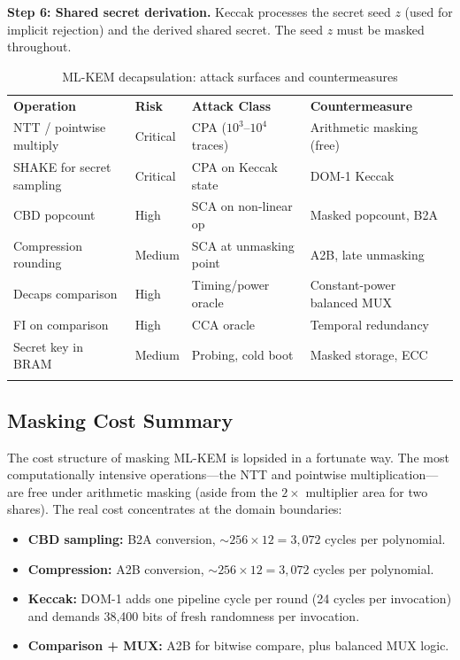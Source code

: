 \textbf{Step 6: Shared secret derivation.}  Keccak processes the secret seed $z$ (used for implicit rejection) and the derived shared secret.  The seed $z$ must be masked throughout.

\begin{table}[t]
\caption{ML-KEM decapsulation: attack surfaces and countermeasures}
\label{tab:mlkem-surfaces}
\begin{tabular}{p{3.5cm}p{1.5cm}p{3cm}p{4cm}}
\hline\noalign{\smallskip}
\textbf{Operation} & \textbf{Risk} & \textbf{Attack Class} & \textbf{Countermeasure} \\
\noalign{\smallskip}\svhline\noalign{\smallskip}
NTT / pointwise multiply & Critical & CPA ($10^3$--$10^4$ traces) & Arithmetic masking (free) \\
SHAKE for secret sampling & Critical & CPA on Keccak state & DOM-1 Keccak \\
CBD popcount & High & SCA on non-linear op & Masked popcount, B2A \\
Compression rounding & Medium & SCA at unmasking point & A2B, late unmasking \\
Decaps comparison & High & Timing/power oracle & Constant-power balanced MUX \\
FI on comparison & High & CCA oracle & Temporal redundancy \\
Secret key in BRAM & Medium & Probing, cold boot & Masked storage, ECC \\
\noalign{\smallskip}\hline
\end{tabular}
\end{table}


\subsection{Masking Cost Summary}
\label{subsec:mlkem-masking-cost}

The cost structure of masking ML-KEM is lopsided in a fortunate way.  The most computationally intensive operations---the NTT and pointwise multiplication---are free under arithmetic masking (aside from the $2\times$ multiplier area for two shares).  The real cost concentrates at the domain boundaries:

\begin{itemize}
\item \textbf{CBD sampling:} B2A conversion, $\sim$$256 \times 12 = 3{,}072$ cycles per polynomial.
\item \textbf{Compression:} A2B conversion, $\sim$$256 \times 12 = 3{,}072$ cycles per polynomial.
\item \textbf{Keccak:} DOM-1 adds one pipeline cycle per round (24 cycles per invocation) and demands 38,400 bits of fresh randomness per invocation.
\item \textbf{Comparison + MUX:} A2B for bitwise compare, plus balanced MUX logic.
\end{itemize}

